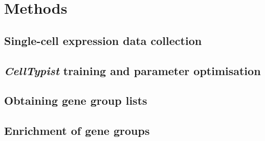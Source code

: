 





\section{Methods}
\label{section4.4}
\subsection{Single-cell expression data collection}
\label{section4.4_datacol}



\subsection{\textit{CellTypist} training and parameter optimisation}
\label{section4.4_model}



\subsection{Obtaining gene group lists}
\label{section4.4_genelists}



\subsection{Enrichment of gene groups}
\label{section4.4_enr}



